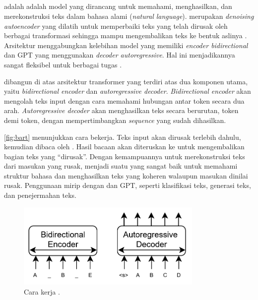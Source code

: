 \subsection{\bartfull}
\label{subsec:bart}

\bartfull adalah adalah model \ml{} yang dirancang untuk memahami, menghasilkan, dan merekonstruksi teks dalam bahasa alami (\emph{natural language}). \bart{} merupakan \emph{denoising autoencoder} yang dilatih untuk memperbaiki teks yang telah dirusak oleh berbagai transformasi sehingga mampu mengembalikan teks ke bentuk aslinya \parencite{lewis2019bart}. Arsitektur \bart{} menggabungkan kelebihan model \bert{} yang memiliki \emph{encoder bidirectional} dan GPT yang menggunakan \emph{decoder autoregressive}. Hal ini menjadikannya sangat fleksibel untuk berbagai tugas \nlpfull.

\bart{} dibangun di atas arsitektur transformer yang terdiri atas dua 
komponen utama, yaitu \emph{bidirectional encoder} dan \textit{autoregressive decoder}. 
\emph{Bidirectional encoder} akan mengolah teks input dengan cara memahami hubungan antar token secara dua arah. \emph{Autoregressive decoder} akan menghasilkan teks secara berurutan, token demi token, dengan mempertimbangkan \emph{sequence} yang sudah dihasilkan.

\autoref{fig:bart} menunjukkan cara \bart{} bekerja. Teks input akan dirusak terlebih dahulu, kemudian dibaca oleh \encoder. Hasil bacaan \encoder{} akan diteruskan ke \decoder{} untuk mengembalikan bagian teks yang “dirusak”. Dengan kemampuannya untuk merekonstruksi teks dari masukan yang rusak, \bart{} menjadi suatu \transformer{} yang sangat baik untuk memahami struktur bahasa dan menghasilkan teks yang koheren walaupun masukan dinilai 
rusak. Penggunaan \bart{} mirip dengan \bert{} dan GPT, seperti klasifikasi teks, generasi teks, dan penejermahan teks. 

\begin{figure}
\centering
\includegraphics[width=0.8\textwidth]{images/bart.png}
\caption{Cara kerja \bart{} \parencite{lewis2019bart}.}
\label{fig:bart}
\end{figure}


